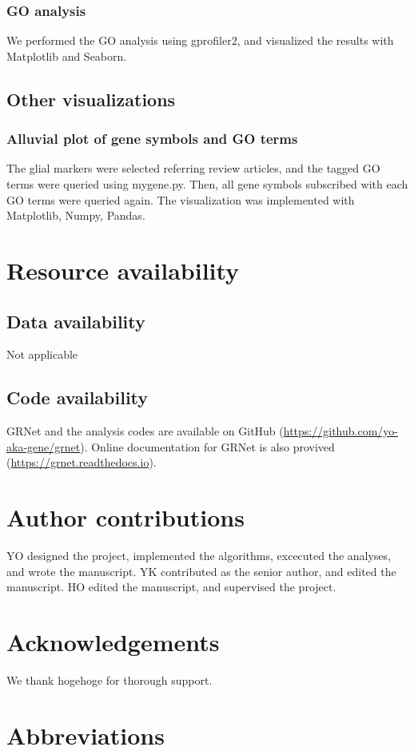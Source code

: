 \documentclass{article}
\begin{document}
\subsubsection*{GO analysis}
We performed the GO analysis using gprofiler2\cite{gprofiler2}, and visualized the results with Matplotlib and Seaborn.

\subsection*{Other visualizations}
\subsubsection*{Alluvial plot of gene symbols and GO terms}
The glial markers were selected referring review articles, and the tagged GO terms were queried using mygene.py. 
Then, all gene symbols subscribed with each GO terms were queried again. The visualization was implemented 
with Matplotlib, Numpy, Pandas.

\section*{Resource availability}
\subsection*{Data availability}
Not applicable
\subsection*{Code availability}
GRNet and the analysis codes are available on GitHub (\url{https://github.com/yo-aka-gene/grnet}).
Online documentation for GRNet is also provived (\url{https://grnet.readthedocs.io}).


\section*{Author contributions}
YO designed the project, implemented the algorithms, excecuted the analyses, and wrote the manuscript. YK 
contributed as the senior author, and edited the manuscript. HO edited the manuscript, and supervised the project.

\section*{Acknowledgements}
We thank hogehoge for thorough support.


\section*{Abbreviations}
\printacronyms[heading=Abbreviations]



\end{document}
